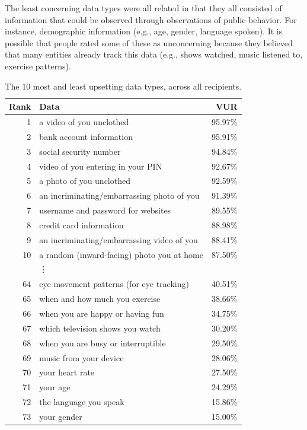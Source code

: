 \documentclass{acm_proc_article-sp}
\begin{document}
The least concerning data types were all related in that they all consisted of information that could be observed through observations of public behavior. For instance, demographic information (e.g., age, gender, language spoken). It is possible that people rated some of these as unconcerning because they believed that many entities already track this data (e.g., shows watched, music listened to, exercise patterns).

\begin{table}[t]
\begin{center}
\small
\begin{tabular}{| r | l | r |}
\hline
Rank & Data &  VUR  \\
\hline
1 & a video of you unclothed & 95.97\% \\
2 & bank account information & 95.91\% \\
3 & social security number & 94.84\% \\
4 & video of you entering in your PIN & 92.67\% \\
5 & a photo of you unclothed & 92.59\% \\
6 & an incriminating/embarrassing photo of you & 91.39\% \\
7 & username and password for websites & 89.55\% \\
8 & credit card information & 88.98\% \\
9 & an incriminating/embarrassing video of you & 88.41\% \\
10 & a random (inward-facing) photo you at home & 87.50\% \\
 & \vdots & \\
64 & eye movement patterns (for eye tracking) & 40.51\% \\
65 & when and how much you exercise  & 38.66\% \\
66 & when you are happy or having fun  & 34.75\% \\
67 & which television shows you watch & 30.20\% \\
68 & when you are busy or interruptible  & 29.50\% \\
69 & music from your device  & 28.06\% \\
70 & your heart rate & 27.50\% \\
71 & your age & 24.29\% \\
72 & the language you speak & 15.86\% \\
73 & your gender & 15.00\% \\ 
\hline
\end{tabular}
\caption{The 10 most and least upsetting data types, across all recipients.}
\label{top10}
\end{center}
\end{table}
\end{document}
